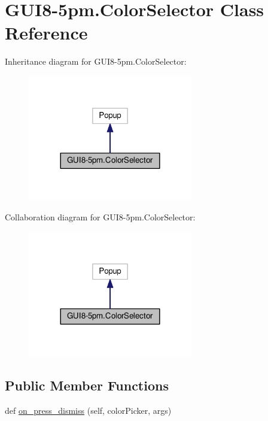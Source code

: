 \hypertarget{classGUI8-5pm_1_1ColorSelector}{}\section{G\+U\+I8-\/5pm.Color\+Selector Class Reference}
\label{classGUI8-5pm_1_1ColorSelector}


Inheritance diagram for G\+U\+I8-\/5pm.Color\+Selector\+:\nopagebreak
\begin{figure}[H]
\begin{center}
\leavevmode
\includegraphics[width=204pt]{classGUI8-5pm_1_1ColorSelector__inherit__graph}
\end{center}
\end{figure}


Collaboration diagram for G\+U\+I8-\/5pm.Color\+Selector\+:\nopagebreak
\begin{figure}[H]
\begin{center}
\leavevmode
\includegraphics[width=204pt]{classGUI8-5pm_1_1ColorSelector__coll__graph}
\end{center}
\end{figure}
\subsection*{Public Member Functions}
\begin{DoxyCompactItemize}
\item 
def \hyperlink{classGUI8-5pm_1_1ColorSelector_ad066b578ca09bc8910db73c32741b8f8}{on\+\_\+press\+\_\+dismiss} (self, color\+Picker, args)
\end{DoxyCompactItemize}
